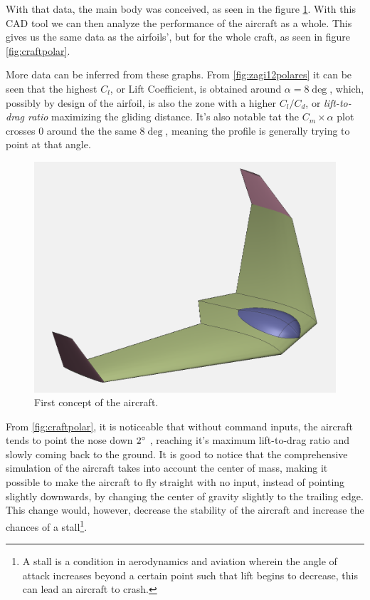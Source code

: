 With that data, the main body was conceived, as seen in the figure \ref{fig:preliminar}. With this CAD tool we can then analyze the performance of the aircraft as a whole. This gives us the same data as the airfoils', but for the whole craft, as seen in figure \ref{fig:craftpolar}.

More data can be inferred from these graphs. From \ref{fig:zagi12polares} it can be seen that the highest $C_l$, or Lift Coefficient, is obtained around $\alpha = 8\deg$, which, possibly by design of the airfoil, is also the zone with a higher $C_l/C_d$, or \textit{lift-to-drag ratio} maximizing the gliding distance. It's also notable tat the $C_m  \times \alpha$ plot crosses 0 around the the same $8\deg$, meaning the profile is generally trying to point at that angle.

\begin{figure}
\centering
  \includegraphics[width=\linewidth]{figs/preliminar.png}
  \caption{First concept of the aircraft.}
  \label{fig:preliminar}
\end{figure}


From \ref{fig:craftpolar}, it is noticeable that without command inputs, the aircraft tends to point the nose down $ 2 \degree $ , reaching it's maximum lift-to-drag ratio and slowly coming back to the ground. It is good to notice that the comprehensive simulation of the aircraft takes into account the center of mass, making it possible to make the aircraft to fly straight with no input, instead of pointing slightly downwards, by changing the center of gravity slightly to the trailing edge. This change would, however, decrease the stability of the aircraft and increase the chances of a stall\footnote{A stall is a condition in aerodynamics and aviation wherein the angle of attack increases beyond a certain point such that lift begins to decrease, this can lead an aircraft to crash.}.

